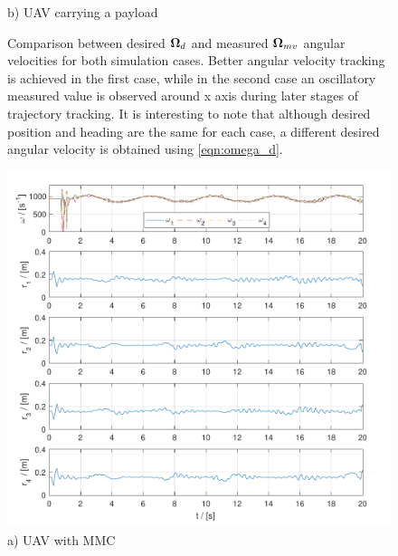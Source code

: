 \begin{figure}
\begin{minipage}{0.5\columnwidth}
		\caption*{b) UAV carrying a payload}
		\label{fig:mmuav_omega}
	\end{minipage}
	\caption{Comparison between desired $\boldsymbol{\Omega}_d$ and measured $\boldsymbol{\Omega}_{mv}$ angular velocities for both simulation cases. Better angular velocity tracking is achieved in the first case, while in the second case an oscillatory measured value is observed around x axis during later stages of trajectory tracking. It is interesting to note that although desired position and heading are the same for each case, a different desired angular velocity is obtained using \eqref{eqn:omega_d}.}
\end{figure}

\begin{figure}
	\centering
	\begin{minipage}{0.5\columnwidth}
		\centering
		\includegraphics[width=\columnwidth]{./pictures/mmcuav_control_inputs.pdf}
		\caption*{a) UAV with MMC}
		\label{fig:mmcuav_control}
	\end{minipage}%
	\begin{minipage}{0.5\columnwidth}
		\centering

\end{minipage}
\end{figure}
